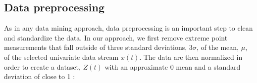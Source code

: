 \subsection{Data preprocessing}

As in any data mining approach, data preprocessing is an important step to clean and standardize the data. In our approach, we first remove extreme point measurements that fall outside of three standard deviations, 3$\sigma$, of the mean, $\mu$, of the selected univariate data stream $x(t)$. The data are then normalized in order to create a dataset, $Z(t)$ with an approximate 0 mean and a standard deviation of close to 1 \cite{goldin_similiarity_1995}: